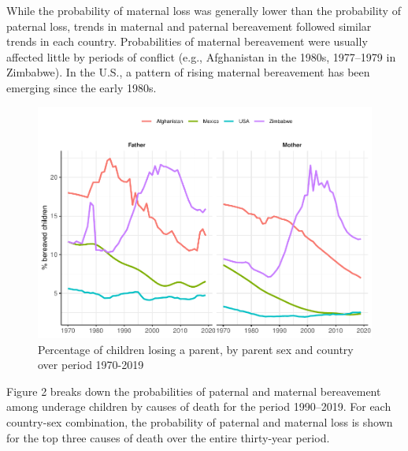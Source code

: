 \documentclass[
  11pt,
  letterpaper,
]{article}
\begin{document}
While the probability of maternal loss was generally lower than the probability of paternal loss, trends in maternal and paternal bereavement followed similar trends in each country. Probabilities of maternal bereavement were usually affected little by periods of conflict (e.g., Afghanistan in the 1980s, 1977--1979 in Zimbabwe). In the U.S., a pattern of rising maternal bereavement has been emerging since the early 1980s.

\begin{figure}
\centering
\includegraphics{parental_loss_global_paa_ext_abstract_files/figure-latex/perc-ber-all-1.pdf}
\caption{\label{fig:perc-ber-all}Percentage of children losing a parent, by parent sex and country over period 1970-2019}
\end{figure}

Figure 2 breaks down the probabilities of paternal and maternal bereavement among underage children by causes of death for the period 1990--2019. For each country-sex combination, the probability of paternal and maternal loss is shown for the top three causes of death over the entire thirty-year period.
\end{document}
